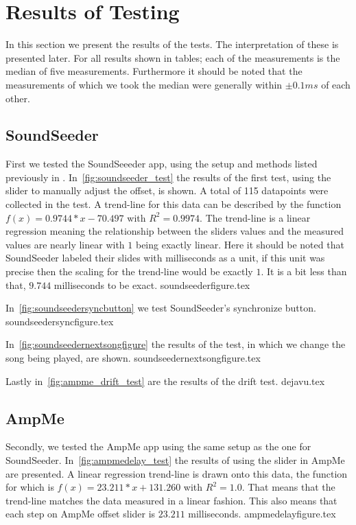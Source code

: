 \section{Results of Testing}
In this section we present the results of the tests.
The interpretation of these is presented later.
For all results shown in tables; each of the measurements is the median of five measurements.
Furthermore it should be noted that the measurements of which we took the median were generally within $\pm 0.1 ms$ of each other.

\subsection{SoundSeeder}
First we tested the SoundSeeeder app, using the setup and methods listed previously in .
In~\vref{fig:soundseeder_test} the results of the first test, using the slider to manually adjust the offset, is shown.
A total of 115 datapoints were collected in the test.
A trend-line for this data can be described by the function $f(x) = 0.9744 * x - 70.497$ with $R^2=0.9974$.
The trend-line is a linear regression meaning the relationship between the sliders values and the measured values are nearly linear with $1$ being exactly linear.
Here it should be noted that SoundSeeder labeled their slides with milliseconds as a unit, if this unit was precise then the scaling for the trend-line would be exactly $1$.
It is a bit less than that, $9.744$ milliseconds to be exact.
{soundseederfigure.tex}

In~\vref{fig:soundseedersyncbutton} we test SoundSeeder's synchronize button.
{soundseedersyncfigure.tex}

In~\vref{fig:soundseedernextsongfigure} the results of the test, in which we change the song being played, are shown.
{soundseedernextsongfigure.tex}

Lastly in~\vref{fig:ampme_drift_test} are the results of the drift test.
{dejavu.tex}

\subsection{AmpMe}
Secondly, we tested the AmpMe app using the same setup as the one for SoundSeeder.
In~\vref{fig:ampmedelay_test} the results of using the slider in AmpMe are presented.
A linear regression trend-line is drawn onto this data, the function for which is $f(x) = 23.211 * x + 131.260$ with $R^2 = 1.0$.
That means that the trend-line matches the data measured in a linear fashion.
This also means that each step on AmpMe offset slider is $23.211$ milliseconds.
{ampmedelayfigure.tex}

